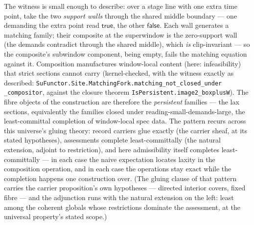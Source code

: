 The witness is small enough to describe: over a stage line with one
extra time point, take the two \emph{support walls} through the
shared middle boundary --- one demanding the extra point read
$\mathsf{true}$, the other $\mathsf{false}$. Each wall generates a
matching family; their composite at the superwindow is the
zero-support wall (the demands contradict through the shared
middle), which \emph{is} clip-invariant --- so the composite's
subwindow component, being empty, fails the matching equation
against it. Composition manufactures window-local content (here:
infeasibility) that strict sections cannot carry
(kernel-checked, with the witness exactly as described:
\texttt{SuFunctor.Site.MatchingFork.matching\_not\_closed\_under%
\_compositor}, against the closure theorem
\texttt{IsPersistent.image2\_boxplusW}). The fibre objects of the
construction are therefore the \emph{persistent} families --- the lax
sections, equivalently the families closed under
reading-small-demands-large, the least-committal completion of
window-local spec data. The pattern recurs across this universe's gluing theory: record carriers glue
exactly (the carrier sheaf, at its stated hypotheses), assessments
complete least-committally (the natural extension, adjoint to
restriction), and here admissibility itself completes
least-committally --- in each
case the naive expectation locates laxity in the composition
operation, and in each case the operations stay exact while the
completion happens one construction over. (The gluing clause of that
pattern carries the carrier proposition's own hypotheses --- directed
interior covers, fixed fibre --- and the adjunction runs with the
natural extension on the left: least among the coherent globals
whose restrictions dominate the assessment, at the universal
property's stated scope.)

